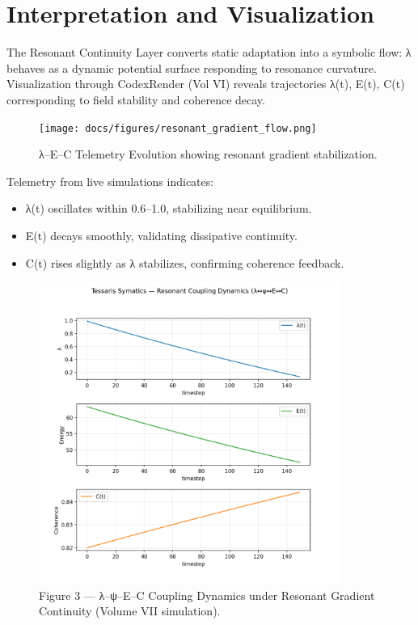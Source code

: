 \documentclass[11pt]{article}
\begin{document}
\section{Interpretation and Visualization}
The Resonant Continuity Layer converts static adaptation into a symbolic flow:
λ behaves as a dynamic potential surface responding to resonance curvature.
Visualization through CodexRender (Vol VI) reveals trajectories λ(t), E(t), C(t)
corresponding to field stability and coherence decay.

\begin{figure}[h!]
\centering
\texttt{[image: docs/figures/resonant\_gradient\_flow.png]}
\caption{λ–E–C Telemetry Evolution showing resonant gradient stabilization.}
\end{figure}

Telemetry from live simulations indicates:
\begin{itemize}
  \item λ(t) oscillates within 0.6–1.0, stabilizing near equilibrium.  
  \item E(t) decays smoothly, validating dissipative continuity.  
  \item C(t) rises slightly as λ stabilizes, confirming coherence feedback.  
\end{itemize}

\begin{figure}[h!]
\centering
\includegraphics[width=0.88\textwidth]{docs/figures/resonant_coupling_dynamics.png}
\caption{Figure 3 — λ–ψ–E–C Coupling Dynamics under Resonant Gradient Continuity (Volume VII simulation).}
\end{figure}
\end{document}
